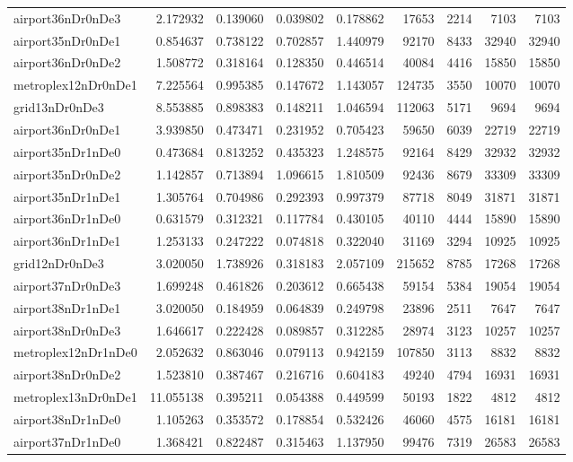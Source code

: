 \begin{longtable}{|l|r|r|r|r|r|r|r|r|}
airport36nDr0nDe3 & 2.172932 & 0.139060 & 0.039802 & 0.178862 & 17653 & 2214 & 7103 & 7103 \\
airport35nDr0nDe1 & 0.854637 & 0.738122 & 0.702857 & 1.440979 & 92170 & 8433 & 32940 & 32940 \\
airport36nDr0nDe2 & 1.508772 & 0.318164 & 0.128350 & 0.446514 & 40084 & 4416 & 15850 & 15850 \\
metroplex12nDr0nDe1 & 7.225564 & 0.995385 & 0.147672 & 1.143057 & 124735 & 3550 & 10070 & 10070 \\
grid13nDr0nDe3 & 8.553885 & 0.898383 & 0.148211 & 1.046594 & 112063 & 5171 & 9694 & 9694 \\
airport36nDr0nDe1 & 3.939850 & 0.473471 & 0.231952 & 0.705423 & 59650 & 6039 & 22719 & 22719 \\
airport35nDr1nDe0 & 0.473684 & 0.813252 & 0.435323 & 1.248575 & 92164 & 8429 & 32932 & 32932 \\
airport35nDr0nDe2 & 1.142857 & 0.713894 & 1.096615 & 1.810509 & 92436 & 8679 & 33309 & 33309 \\
airport35nDr1nDe1 & 1.305764 & 0.704986 & 0.292393 & 0.997379 & 87718 & 8049 & 31871 & 31871 \\
airport36nDr1nDe0 & 0.631579 & 0.312321 & 0.117784 & 0.430105 & 40110 & 4444 & 15890 & 15890 \\
airport36nDr1nDe1 & 1.253133 & 0.247222 & 0.074818 & 0.322040 & 31169 & 3294 & 10925 & 10925 \\
grid12nDr0nDe3 & 3.020050 & 1.738926 & 0.318183 & 2.057109 & 215652 & 8785 & 17268 & 17268 \\
airport37nDr0nDe3 & 1.699248 & 0.461826 & 0.203612 & 0.665438 & 59154 & 5384 & 19054 & 19054 \\
airport38nDr1nDe1 & 3.020050 & 0.184959 & 0.064839 & 0.249798 & 23896 & 2511 & 7647 & 7647 \\
airport38nDr0nDe3 & 1.646617 & 0.222428 & 0.089857 & 0.312285 & 28974 & 3123 & 10257 & 10257 \\
metroplex12nDr1nDe0 & 2.052632 & 0.863046 & 0.079113 & 0.942159 & 107850 & 3113 & 8832 & 8832 \\
airport38nDr0nDe2 & 1.523810 & 0.387467 & 0.216716 & 0.604183 & 49240 & 4794 & 16931 & 16931 \\
metroplex13nDr0nDe1 & 11.055138 & 0.395211 & 0.054388 & 0.449599 & 50193 & 1822 & 4812 & 4812 \\
airport38nDr1nDe0 & 1.105263 & 0.353572 & 0.178854 & 0.532426 & 46060 & 4575 & 16181 & 16181 \\
airport37nDr1nDe0 & 1.368421 & 0.822487 & 0.315463 & 1.137950 & 99476 & 7319 & 26583 & 26583 \\

\end{longtable}
